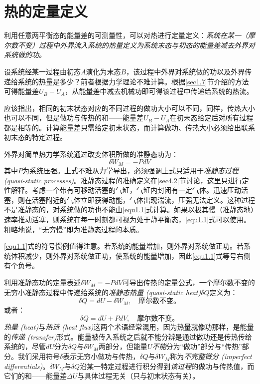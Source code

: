 \section{热的定量定义}
\label{sec1.8}
利用任意两平衡态的能量差的可测量性，可以对热进行定量定义：{\it 系统在某一（摩尔数不变）过程中外界流入系统的热量定义为系统末态与初态的能量差减去外界对系统做的功。}

设系统经某一过程由初态$A$演化为末态$B$，该过程中外界对系统做的功以及外界传递给系统的热量是多少？前者根据力学理论不难计算。根据\ref{sec1.7}节介绍的方法可得能量差$U_B - U_A$，从能量差中减去机械功即可得该过程中传递给系统的热流。

应该指出，相同的初末状态对应的不同过程的做功大小可以不同，同样，传热大小也可以不同，但是做功与传热的和——能量差$U_B - U_A$在初末态给定后对所有过程都是相等的。计算能量差只需给定初末状态，而计算做功、传热大小必须给出联系初末态的特定过程。

外界对简单热力学系统通过改变体积所做的准静态功为：
\begin{equation}
\label{equ1.1}
	\delta W_M = -P dV
\end{equation}
其中$P$为系统压强。上式不难从力学导出，必须强调上式只适用于{\it 准静态过程 (quasi-static processes)}。准静态过程的准确定义在\ref{sec4.2}节讨论，这里只进行定性解释。考虑一个带有可移动活塞的气缸，气缸内封闭有一定气体。迅速压动活塞，则在活塞附近的气体立即获得动能，气体出现湍流，压强无法定义。这种过程不是准静态的，对系统做的功也不能由\eqref{equ1.1}式计算。如果以极其慢（准静态地）速率推动活塞，则系统在每一时刻都可视为处于静平衡态，\eqref{equ1.1}式可以使用。粗略地说，“无穷慢”即为准静态过程的本质。

\eqref{equ1.1}式的符号惯例值得注意。若系统的能量增加，则外界对系统做正功。若系统体积减少，则外界对系统做正功，使系统的能量增加，因此\eqref{equ1.1}式等号右侧有个负号。

利用准静态功的定量表述$\delta W_M = -PdV$可导出传热的定量公式，一个摩尔数不变的无穷小准静态过程中传递给系统的{\it 准静态热量 (quasi-static heat)}$\delta Q$定义为：
\begin{equation}
\label{equ1.2}
	\delta Q = dU - \delta W_M, \quad \text{摩尔数不变。}
\end{equation}
或者：
\begin{equation}
\label{equ1.3}
	\delta Q = dU + P dV, \quad \text{摩尔数不变。}
\end{equation}
{\it 热量 (heat)}与{\it 热流 (heat flux)}这两个术语经常混用，因为热量就像功那样，是能量的{\it 传递 (transfer)}形式。能量被传入系统之后就不能分辨是通过做功还是传热传给系统的，尽管$dU$分为$\delta Q$与$\delta W_M$两部分，但能量$U${\it 不能}分为“做功”部分与“传热”部分。我们采用符号$\delta$表示无穷小做功与传热，$\delta Q$与$\delta W_M$称为{\it 不完整微分 (imperfect differentials)}。$\delta W_M$与$\delta Q$沿某一特定过程进行积分得到{\it 该过程}的做功与传热值，而它们的和——能量差$\Delta U$与具体过程无关（只与初末状态有关）。

